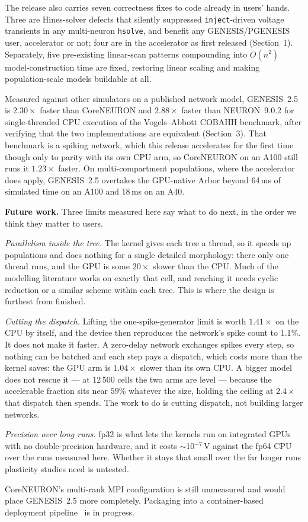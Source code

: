 \documentclass[preprint,12pt, a4paper]{elsarticle}
\begin{document}
\begin{enumerate}
The release also carries seven correctness fixes to code already in users' hands. Three are Hines-solver defects that silently suppressed \texttt{inject}-driven voltage transients in any multi-neuron \texttt{hsolve}, and benefit any GENESIS/PGENESIS user, accelerator or not; four are in the accelerator as first released (Section~1). Separately, five pre-existing linear-scan patterns compounding into $O(n^2)$ model-construction time are fixed, restoring linear scaling and making population-scale models buildable at all.

Measured against other simulators on a published network model, GENESIS~2.5 is $2.30\times$ faster than CoreNEURON and $2.88\times$ faster than NEURON~9.0.2 for single-threaded CPU execution of the Vogels--Abbott COBAHH benchmark, after verifying that the two implementations are equivalent (Section~3). That benchmark is a spiking network, which this release accelerates for the first time though only to parity with its own CPU arm, so CoreNEURON on an A100 still runs it $1.23\times$ faster. On multi-compartment populations, where the accelerator does apply, GENESIS~2.5 overtakes the GPU-native Arbor beyond 64\,ms of simulated time on an A100 and 18\,ms on an A40.

\textbf{Future work.} Three limits measured here say what to do next, in the order we think they matter to users.

\emph{Parallelism inside the tree.} The kernel gives each tree a thread, so it speeds up populations and does nothing for a single detailed morphology: there only one thread runs, and the GPU is some $20\times$ slower than the CPU. Much of the modelling literature works on exactly that cell, and reaching it needs cyclic reduction or a similar scheme within each tree. This is where the design is furthest from finished.

\emph{Cutting the dispatch.} Lifting the one-spike-generator limit is worth $1.41\times$ on the CPU by itself, and the device then reproduces the network's spike count to $1.1\%$. It does not make it faster. A zero-delay network exchanges spikes every step, so nothing can be batched and each step pays a dispatch, which costs more than the kernel saves: the GPU arm is $1.04\times$ slower than its own CPU. A bigger model does not rescue it --- at 12\,500 cells the two arms are level --- because the accelerable fraction sits near $59\%$ whatever the size, holding the ceiling at $2.4\times$ that dispatch then spends. The work to do is cutting dispatch, not building larger networks.

\emph{Precision over long runs.} fp32 is what lets the kernels run on integrated GPUs with no double-precision hardware, and it costs $\sim$10$^{-7}$\,V against the fp64 CPU over the runs measured here. Whether it stays that small over the far longer runs plasticity studies need is untested.

CoreNEURON's multi-rank MPI configuration is still unmeasured and would place GENESIS~2.5 more completely. Packaging into a container-based deployment pipeline~\cite{chlasta2023pipeline} is in progress.

\end{enumerate}
\end{document}
